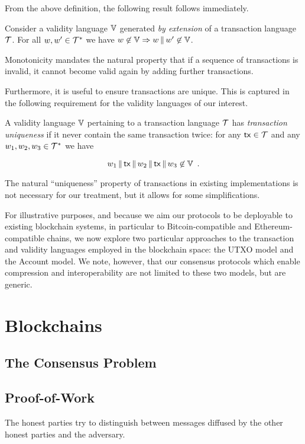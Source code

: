 From the above definition, the following result follows immediately.

\begin{lemma}
  Consider a validity language $\mathbb{V}$ generated \emph{by extension} of a
  transaction language $\mathcal{T}$. For all $w,w'\in \mathcal{T}^*$ we have
  $w\not\in\mathbb{V} \Rightarrow w\,\|\, w'\not\in\mathbb{V}$.
\end{lemma}

Monotonicity mandates the natural property that if a sequence of transactions is
invalid, it cannot become valid again by adding further transactions.

Furthermore, it is useful to ensure transactions are unique. This is captured in
the following requirement for the validity languages of our interest.

\begin{definition}\label{def:trans-uniqueness}
  A validity language $\mathbb{V}$ pertaining to a transaction language $\mathcal{T}$
  has \emph{transaction uniqueness} if it never contain the same transaction
  twice: for any $\mathsf{tx}\in \mathcal{T}$ and any
  $w_1,w_2,w_3\in \mathcal{T}^*$ we have

  \[ w_1\,\|\,\mathsf{tx}\,\|\,
  w_2\,\|\,\mathsf{tx}\,\|\, w_3\not\in\mathbb{V} \,~. \]
\end{definition}

The natural ``uniqueness'' property of transactions in existing implementations
is not necessary for our treatment, but it allows for some simplifications.

For illustrative purposes, and because we aim our protocols to be deployable to
existing blockchain systems, in particular to Bitcoin-compatible and
Ethereum-compatible chains, we now explore two particular approaches to the
transaction and validity languages employed in the blockchain space: the UTXO
model and the Account model. We note, however, that our consensus protocols
which enable compression and interoperability are not limited to these two
models, but are generic.

\section{Blockchains}
\subsection{The Consensus Problem}
\subsection{Proof-of-Work}
\cite{pow}
The
honest parties try to distinguish between messages diffused by the other honest
parties and the adversary.

